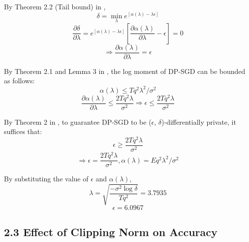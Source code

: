 By Theorem 2.2 (Tail bound) in \cite{abadi},
$$ \delta = \min_\lambda e^{[\alpha(\lambda) - \lambda\epsilon]} $$
$$ \frac{\partial \delta}{\partial \lambda} = e^{[\alpha(\lambda) - \lambda\epsilon]}[\frac{\partial \alpha(\lambda)}{\partial \lambda} - \epsilon] = 0 $$
$$ \Rightarrow \frac{\partial \alpha(\lambda)}{\partial \lambda} = \epsilon $$

By Theorem 2.1 and Lemma 3 in \cite{abadi}, the log moment of DP-SGD can be bounded as follows:
$$ \alpha(\lambda) \leq T q^2\lambda^2 / \sigma^2 $$
$$ \frac{\partial \alpha(\lambda)}{\partial \lambda} \leq \frac{2Tq^2 \lambda}{\sigma^2} \Rightarrow \epsilon \leq \frac{2Tq^2 \lambda}{\sigma^2} $$

By Theorem 2 in \cite{abadi}, to guarantee DP-SGD to be ($\epsilon$, $\delta$)-differentially private, it suffices that:
$$ \epsilon \geq \frac{2Tq^2 \lambda}{\sigma^2} $$
$$ \Rightarrow \epsilon = \frac{2Tq^2 \lambda}{\sigma^2}, \alpha(\lambda) = E q^2\lambda^2 / \sigma^2 $$

By substituting the value of $\epsilon$ and $\alpha(\lambda)$,
$$ \lambda = \sqrt{\frac{-\sigma^2 \log \delta}{Tq^2}} = 3.7935 $$
$$ \epsilon = 6.0967 $$


\subsection*{2.3 Effect of Clipping Norm on Accuracy}

